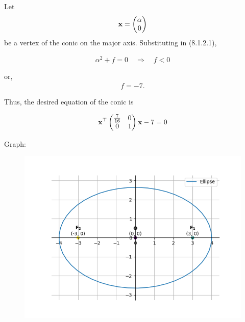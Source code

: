 \documentclass{beamer}
\numberwithin{equation}{section}
\begin{document}
Let 
\begin{align}
		\mathbf{x} = \begin{pmatrix} \alpha\\0\end{pmatrix}
\end{align}
be a vertex of the conic on the major axis. Substituting in (8.1.2.1),

\begin{align}
\alpha^2 + f = 0 \quad \Longrightarrow \quad f < 0
\end{align}

or,  
\begin{align}
f = -7.
\end{align}

Thus, the desired equation of the conic is  

\begin{align}
		\mathbf{x}^\top 
\begin{pmatrix}
\frac{7}{16} & 0 \\ 
0 & 1
\end{pmatrix} 
		\mathbf{x} - 7 = 0
\end{align}

	Graph:
\begin{figure}[h!]
	\centering
	\includegraphics[width=0.7\linewidth]{img.png}
\end{figure}
\end{document}
